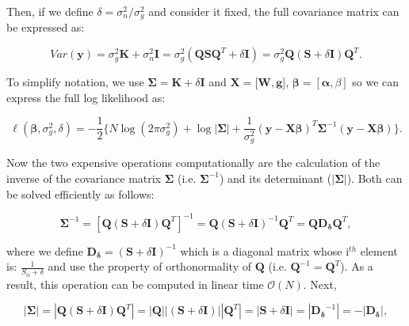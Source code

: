 Then, if we define $\delta = \sigma_n^2/\sigma_g^2$ and consider it fixed, the full covariance matrix can be expressed as:

\begin{equation}\label{eq:fast_lmm_full_covariance}
 Var(\mathbf{y}) = \sigma_g^2\mathbf{K} + \sigma_n^2\mathbf{I} = \sigma_g^2(\mathbf{Q}\mathbf{S}\mathbf{Q}^T + \delta\mathbf{I})= \sigma_g^2\mathbf{Q} (\mathbf{S} + \delta\mathbf{I})\mathbf{Q}^T.
\end{equation}

\vspace{4mm}

To simplify notation, we use $\boldsymbol{\Sigma} = \mathbf{K} + \delta\mathbf{I}$ and $\mathbf{X} = [\mathbf{W}, \mathbf{g}$], $\boldsymbol{\beta} = [\boldsymbol{\alpha}, \beta]$ so we can express the full log likelihood as:

\begin{equation} \label{eq:fast_lmm_log_likelihood}
 \ell(\boldsymbol{\beta}, \sigma_g^2, \delta) = -\frac{1}{2} \bigg\{N\log(2\pi\sigma_g^2) + \log{|\boldsymbol{\Sigma}|}+ \frac{1}{\sigma_g^2}(\mathbf{y}-\mathbf{X}\boldsymbol{\beta})^T\boldsymbol{\Sigma}^{-1}(\mathbf{y}-\mathbf{X}\boldsymbol{\beta}) \bigg\}. 
\end{equation}

Now the two expensive operations computationally are the calculation of the inverse of the covariance matrix $\boldsymbol{\Sigma}$ (i.e. $\boldsymbol{\Sigma}^{-1}$) and its determinant ($|\boldsymbol{\Sigma}|$). 
Both can be solved efficiently as follows:  

\begin{equation}\label{eq:fast_lmm_Sigma_inverse}
    \boldsymbol{\Sigma}^{-1} = [\mathbf{Q} (\mathbf{S} + \delta\mathbf{I})\mathbf{Q}^T]^{-1} = \mathbf{Q} (\mathbf{S} + \delta\mathbf{I})^{-1}\mathbf{Q}^T = \mathbf{Q} \mathbf{D_{\delta}}\mathbf{Q}^T,
\end{equation}

where we define $\mathbf{D_{\delta}}=(\mathbf{S} + \delta\mathbf{I})^{-1}$ which is a diagonal matrix whose i$^{th}$ element is: $\frac{1}{S_{ii} + \delta}$ and use the property of orthonormality of $\mathbf{Q}$ (i.e. $\mathbf{Q}^{-1} = \mathbf{Q}^T$).
As a result, this operation can be computed in linear time $\mathcal{O}(N)$. 
Next,

\begin{equation}\label{eq:fast_lmm_Sigma_determinant}
    |\boldsymbol{\Sigma}| = |\mathbf{Q} (\mathbf{S} + \delta\mathbf{I})\mathbf{Q}^T|= |\mathbf{Q}||(\mathbf{S} + \delta\mathbf{I})||\mathbf{Q}^T| = |\mathbf{S} + \delta\mathbf{I}| = |\mathbf{D_{\delta}}^{-1}| = - |\mathbf{D_{\delta}}|,
\end{equation}

